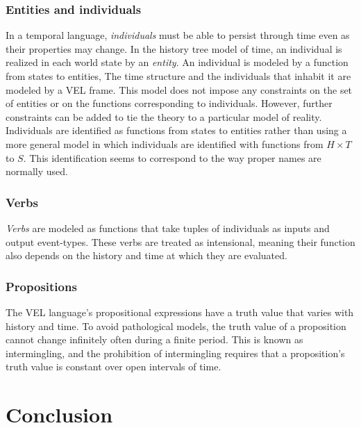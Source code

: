 \subsubsection{Entities and individuals}
In a temporal language, \textit{individuals} must be able to persist through time even as their properties may change.
In the history tree model of time, an individual is realized in each world state by an \textit{entity}.
An individual is modeled by a function from states to entities, The time structure and the individuals that inhabit it are modeled by a VEL frame. This model does not impose any constraints on the set of entities or on the functions corresponding to individuals.
However, further constraints can be added to tie the theory to a particular model of reality.
Individuals are identified as functions from states to entities rather than using a more general model in which individuals are identified with functions from $H \times T$ to $S$. This identification seems to correspond to the way proper names are normally used.

\subsubsection{Verbs}
\textit{Verbs} are modeled as functions that take tuples of individuals as inputs and output event-types.
These verbs are treated as intensional, meaning their function also depends on the history and time at which they are evaluated.
\subsubsection{Propositions}
The VEL language's propositional expressions have a truth value that varies with history and time. To avoid pathological models, the truth value of a proposition cannot change infinitely often during a finite period. This is known as intermingling, and the prohibition of intermingling requires that a proposition's truth value is constant over open intervals of time.

\section{Conclusion}
